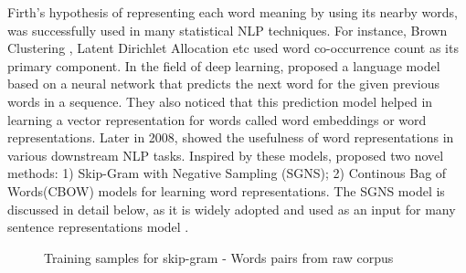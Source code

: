 \documentclass[12pt]{report} %
\begin{document}
Firth's hypothesis of representing each word meaning by using its nearby words, was successfully used in many statistical NLP techniques. For instance, Brown Clustering \citep{brown1992practical} , Latent Dirichlet Allocation \citep{blei2003latent} etc used word co-occurrence count as its primary component. In the field of deep learning, \cite{bengio2003neural} proposed a language model based on a neural network that predicts the next word for the given previous words in a sequence. They also noticed that this prediction model helped in learning a vector representation for words called word embeddings or word representations.
Later in 2008, \cite{collobert2008unified} showed the usefulness of word representations in various downstream NLP tasks.
Inspired by these models, \cite{mikolov2014word2vec} proposed two novel methods: 1) Skip-Gram with Negative Sampling (SGNS); 2) Continous Bag of Words(CBOW) models for learning word representations. The SGNS model is discussed in detail below, as it is widely adopted and used as an input for many sentence representations model \citep{kiros2015skip}.

\begin{figure}[!tbp]
	\centering
	\caption{Training samples for skip-gram - Words pairs from raw corpus}
	\label{train_sam}
	
\end{figure}
\end{document}
